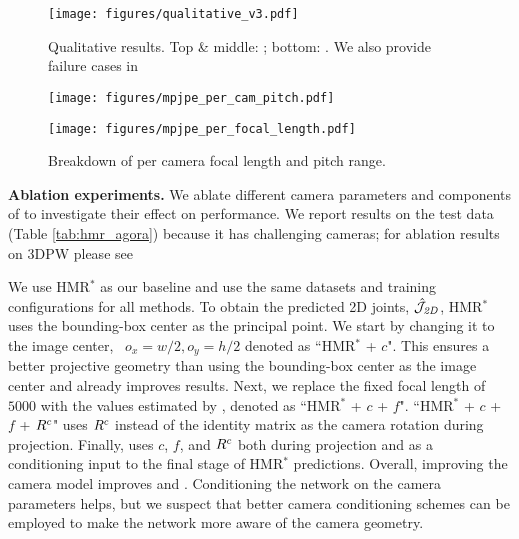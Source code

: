 \documentclass[10pt,twocolumn,letterpaper,usenames,dvipsnames]{article}
\begin{document}
\begin{figure*}[h]
    \centering
    \texttt{[image: figures/qualitative\_v3.pdf]}
    \vspace{-0.1in}
    \caption{Qualitative results. Top \& middle: \mtpcam; bottom: \agoracam. We also provide failure cases in \supmat 
}
    \label{fig:qualitative}
    \vspace{-2ex}
\end{figure*}

\begin{figure}[h]
    \centering
    \begin{minipage}{.25\textwidth}
        \centering
        \texttt{[image: figures/mpjpe\_per\_cam\_pitch.pdf]}
\end{minipage}\begin{minipage}{.25\textwidth}
        \centering
        \texttt{[image: figures/mpjpe\_per\_focal\_length.pdf]}
\end{minipage}\vspace{-0.1in}
    \caption{Breakdown of \wmpjpe per camera focal length and pitch range.}
    \label{fig:error_breakdown}
    \vspace{-3ex}
\end{figure}

\textbf{Ablation experiments.} We ablate different camera parameters and components of \methodname to investigate their effect on performance. 
We report results on the \agoracam test data (Table \ref{tab:hmr_agora}) because it has challenging cameras; for ablation results on 3DPW please see \supmat 

We use HMR$^{*}$ as our baseline and use the same datasets and training configurations for all methods. 
To obtain the predicted 2D joints, $\hat{\mathcal{J}}_{\mathit{2D}}$, HMR$^{*}$ uses the bounding-box center as the principal point. 
We start by changing it to the image center, \ie~$o_x=w/2, o_y=h/2$ denoted as ``HMR$^{*}$ + $c$". 
This ensures a better projective geometry than using the bounding-box center as the image center and already improves results. 
Next, we replace the fixed focal length of $5000$ with the values estimated by \camcalib, denoted as ``HMR$^{*}$ + $c$ + $f$". 
``HMR$^{*}$ + $c$ + $f$ + $R^c$" uses $R^c$ instead of the identity matrix as the camera rotation during projection. 
Finally, \methodname uses $c$, $f$, and $R^c$ both during projection and as a conditioning input to the final stage of HMR$^{*}$ predictions. 
Overall, improving the camera model improves  \wmpjpe and \wpve. 
Conditioning the network on the camera parameters helps, but we suspect that better camera conditioning schemes can be employed to make the network more aware of the camera geometry. 
\end{document}
